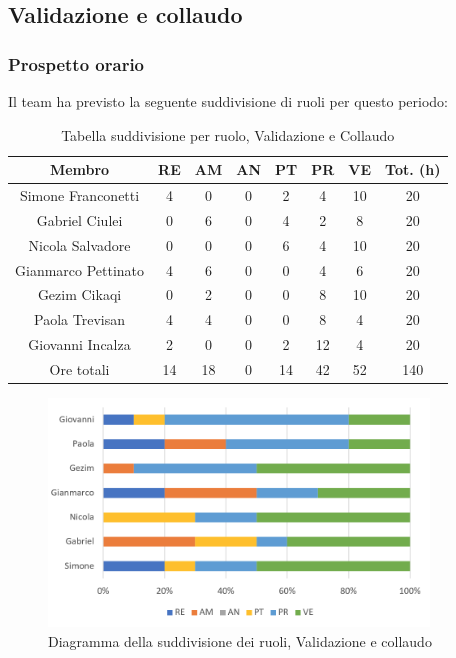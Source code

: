 \subsection{Validazione e collaudo}
\subsubsection{Prospetto orario}
Il team ha previsto la seguente suddivisione di ruoli per questo periodo:\\
\begin{table}[h!]
\caption{Tabella suddivisione per ruolo, Validazione e Collaudo}
\begin{center}
\begin{tabular}{ |c|c|c|c|c|c|c|c|  }
 \hline
 Membro 		& RE 	& AM 	& AN 	& PT 	& PR 	& VE 	& Tot. (h)\\
 \hline\hline
 Simone Franconetti			& 4 		& 0		& 0 	& 2 		& 4 		& 10 		& 20\\
 Gabriel Ciulei		& 0 		& 6 		& 0 	& 4		& 2 		& 8 		& 20\\
 Nicola	Salvadore		& 0 		& 0 		& 0 	& 6 		& 4 		& 10 		& 20\\
 Gianmarco Pettinato		& 4 		& 6 		& 0 	& 0	 	& 4 		& 6 		& 20\\
 Gezim Cikaqi			& 0 		& 2 		& 0 	& 0 		& 8 		& 10	 	& 20\\
 Paola Trevisan			& 4 		& 4 		& 0 	& 0 		& 8 		& 4 		& 20\\
 Giovanni Incalza		& 2 		& 0	 	& 0 	& 2 		& 12 	& 4  	& 20\\
 \hline\hline
 Ore totali		& 14		& 18		& 0 	& 14	 	& 42 	& 52 	& 140\\
  \hline
\end{tabular}
\end{center}
\end{table}
\begin{figure}[h!]
	\centering
	\includegraphics[width=0.9\textwidth]{res/img/hi5}
	\caption{Diagramma della suddivisione dei ruoli, Validazione e collaudo}
\end{figure}
